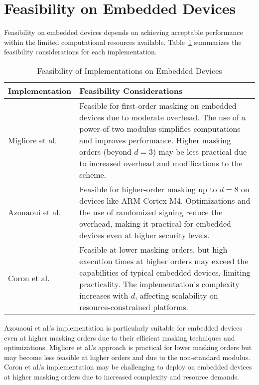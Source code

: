 \section{Feasibility on Embedded Devices}

Feasibility on embedded devices depends on achieving acceptable performance within the limited computational resources available. Table~\ref{tab:feasibility} summarizes the feasibility considerations for each implementation.

\begin{table}[h]
    \centering
    \renewcommand{\arraystretch}{1.2}
    \caption{Feasibility of Implementations on Embedded Devices}
    \begin{tabular}{l | p{10cm}}
        \toprule
        \textbf{Implementation}           & \textbf{Feasibility Considerations}                                                                                                                                                                                                                                                      \\
        \midrule
        Migliore et al.~\cite{Migliore19} & Feasible for first-order masking on embedded devices due to moderate overhead. The use of a power-of-two modulus simplifies computations and improves performance. Higher masking orders (beyond $d=3$) may be less practical due to increased overhead and modifications to the scheme. \\
        \midrule
        Azouaoui et al.~\cite{Azouaoui22} & Feasible for higher-order masking up to $d=8$ on devices like ARM Cortex-M4. Optimizations and the use of randomized signing reduce the overhead, making it practical for embedded devices even at higher security levels.                                                               \\
        \midrule
        Coron et al.~\cite{Coron23}       & Feasible at lower masking orders, but high execution times at higher orders may exceed the capabilities of typical embedded devices, limiting practicality. The implementation's complexity increases with $d$, affecting scalability on resource-constrained platforms.                 \\
        \bottomrule
    \end{tabular}
    \label{tab:feasibility}
\end{table}

Azouaoui et al.'s implementation is particularly suitable for embedded devices even at higher masking orders due to their efficient masking techniques and optimizations. Migliore et al.'s approach is practical for lower masking orders but may become less feasible at higher orders and due to the non-standard modulus. Coron et al.'s implementation may be challenging to deploy on embedded devices at higher masking orders due to increased complexity and resource demands.

